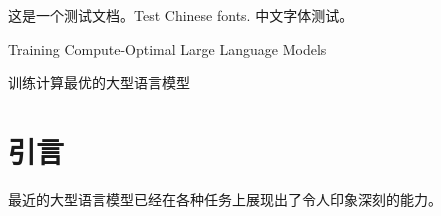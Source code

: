\documentclass{article}
\begin{document}
这是一个测试文档。Test Chinese fonts. 中文字体测试。

Training Compute-Optimal Large Language Models

训练计算最优的大型语言模型

\section{引言}

最近的大型语言模型已经在各种任务上展现出了令人印象深刻的能力。
\end{document}
